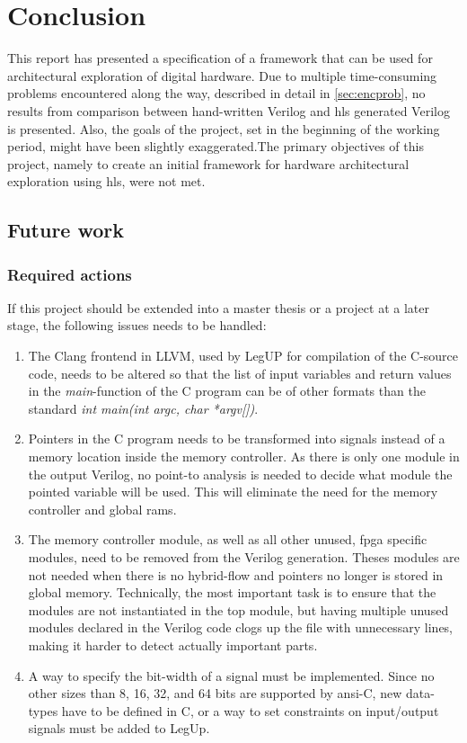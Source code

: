 \chapter{Conclusion}
\label{chp:conclusion} 
This report has presented a specification of a framework that can be used for architectural exploration of digital hardware. Due to multiple time-consuming problems encountered along the way, described in detail in \cref{sec:encprob}, no results from comparison between hand-written Verilog and \gls{hls} generated Verilog is presented. Also, the goals of the project, set in the beginning of the working period, might have been slightly exaggerated.The primary objectives of this project, namely to create an initial framework for hardware architectural exploration using \gls{hls}, were not met.
\section{Future work}
\label{sec:futurework} 


\subsection{Required actions}
\label{subsec:reqact}
If this project should be extended into a master thesis or a project at a later stage, the following issues needs to be handled:
\begin{enumerate}
    \item \label{item:futworkprob}The Clang frontend in LLVM, used by LegUP for compilation of the C-source code, needs to be altered so that the list of input variables and return values in the \textit{main}-function of the C program can be of other formats than the standard \textit{int main(int argc, char *argv[])}.
    \item Pointers in the C program needs to be transformed into signals instead of a memory location inside the memory controller. As there is only one module in the output Verilog, no point-to analysis is needed to decide what module the pointed variable will be used. This will eliminate the need for the memory controller and global \gls{ram}s.
    \item The memory controller module, as well as all other unused, \gls{fpga} specific modules, need to be removed from the Verilog generation. Theses modules are not needed when there is no hybrid-flow and pointers no longer is stored in global memory. Technically, the most important task is to ensure that the modules are not instantiated in the top module, but having multiple unused modules declared in the Verilog code clogs up the file with unnecessary lines, making it harder to detect actually important parts.
    \item A way to specify the bit-width of a signal must be implemented. Since no other sizes than 8, 16, 32, and 64 bits are supported by \gls{ansi}-C, new data-types have to be defined in C, or a way to set constraints on input/output signals must be added to LegUp.
\end{enumerate}

